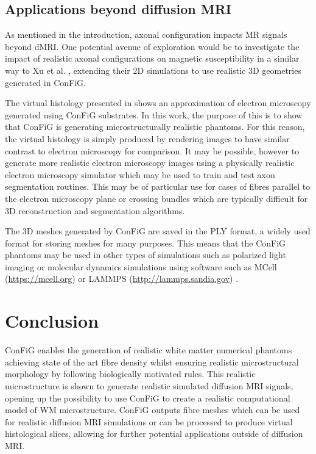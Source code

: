 \subsection*{Applications beyond diffusion \ac{MRI}}
\label{sec:config_beyond_dmri}
As mentioned in the introduction, axonal configuration impacts MR signals beyond \ac{dMRI}. One potential avenue of exploration would be to investigate the impact of realistic axonal configurations on magnetic susceptibility in a similar way to Xu et al. \cite{Xu2018}, extending their 2D simulations to use realistic 3D geometries generated in \ac{ConFiG}.

The virtual histology presented in  shows an approximation of electron microscopy generated using \ac{ConFiG} substrates. In this work, the purpose of this is to show that \ac{ConFiG} is generating microstructurally realistic phantoms. For this reason, the virtual histology is simply produced by rendering images to have similar contrast to electron microscopy for comparison. It may be possible, however to generate more realistic electron microscopy images using a physically realistic electron microscopy simulator \cite{Ophus2017,Grella2003,Babin2010} which may be used to train and test axon segmentation routines. This may be of particular use for cases of fibres parallel to the electron microscopy plane or crossing bundles which are typically difficult for 3D reconstruction and segmentation algorithms.

The 3D meshes generated by \ac{ConFiG} are saved in the PLY format, a widely used format for storing meshes for many purposes. This means that the \ac{ConFiG} phantoms may be used in other types of simulations such as polarized light imaging \cite{Matuschke2019,Menzel2015} or molecular dynamics simulations using software such as MCell (\url{https://mcell.org}) \cite{Kerr2008a,Stiles2001,Stiles1996} or LAMMPS (\url{http://lammps.sandia.gov}) \cite{Plimpton1997}.

\section{Conclusion}
\label{sec:config_conclusion}
ConFiG enables the generation of realistic white matter numerical phantoms achieving state of the art fibre density whilst ensuring realistic microstructural morphology by following biologically motivated rules. This realistic microstructure is shown to generate realistic simulated diffusion \ac{MRI} signals, opening up the possibility to use \ac{ConFiG} to create a realistic computational model of \ac{WM} microstructure.
ConFiG outputs fibre meshes which can be used for realistic diffusion \ac{MRI} simulations or can be processed to produce virtual histological slices, allowing for further potential applications outside of diffusion \ac{MRI}.

